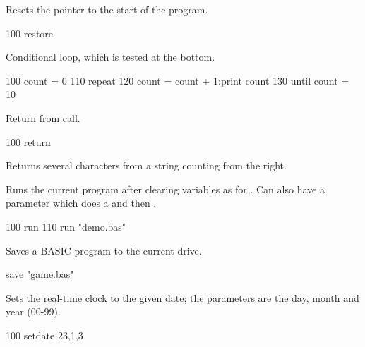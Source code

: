 \begin{entry}
Resets the  pointer to the start of the program.

\begin{lstexample}
100 restore
\end{lstexample}
\end{entry}

\begin{entry}
Conditional loop, which is tested at the bottom.

\begin{lstexample}
100 count = 0
110 repeat
120 count = count + 1:print count
130 until count = 10
\end{lstexample}
\end{entry}

\begin{entry}
Return from  call.

\begin{lstexample}
100 return
\end{lstexample}
\end{entry}

\begin{entry}
Returns several characters from a string counting from the right.

\end{entry}

\begin{entry}
Runs the current program after clearing variables as for . Can also have a parameter which does a  and then .

\begin{lstexample}
100 run
110 run "demo.bas"
\end{lstexample}
\end{entry}

\begin{entry}
Saves a BASIC program to the current drive.

\begin{lstexample}
save "game.bas"
\end{lstexample}
\end{entry}

\begin{entry}
Sets the real-time clock to the given date; the parameters are the day, month and year (00-99).

\begin{lstexample}
100 setdate 23,1,3
\end{lstexample}
\end{entry}

